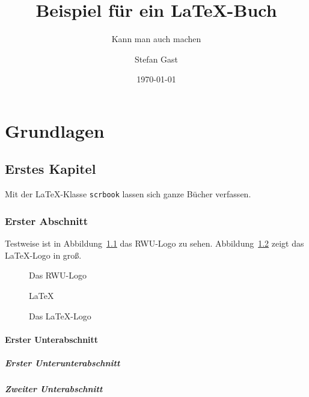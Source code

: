 \documentclass{scrbook}
\title{Beispiel für ein \LaTeX-Buch}
\subtitle{Kann man auch machen}
\author{Stefan Gast}
\date{\today}
\begin{document}
	\maketitle
	\tableofcontents

	\part{Grundlagen}

	\chapter{Erstes Kapitel}

		Mit der \LaTeX-Klasse \verb?scrbook? lassen sich ganze Bücher
		verfassen.

		\section{Erster Abschnitt}

			Testweise ist in Abbildung~\ref{fig:logo} das RWU-Logo
			zu sehen. Abbildung~\ref{fig:latex} zeigt das \LaTeX-Logo
			in groß.

			\begin{figure}
				\centering
				\rwulogo[width=0.5\columnwidth]
				\caption{Das RWU-Logo}
				\label{fig:logo}
			\end{figure}

			\begin{figure}
				\centering
				\Huge{\LaTeX}
				\caption{Das \LaTeX-Logo}
				\label{fig:latex}
			\end{figure}

			\lipsum[1]

			\subsection{Erster Unterabschnitt}

				\lipsum[2]

				\subsubsection{Erster Unterunterabschnitt}

					\lipsum[2-5]

				\subsubsection{Zweiter Unterabschnitt}

					\lipsum[6-12]
\end{document}
